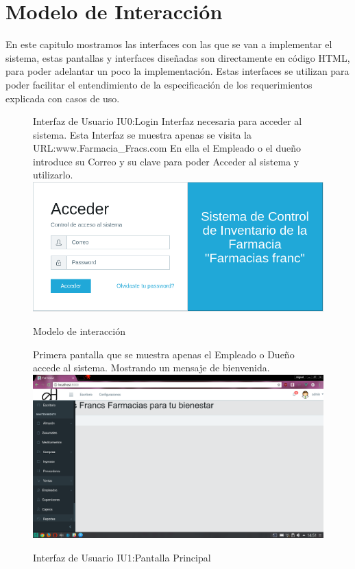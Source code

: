 \chapter{Modelo de Interacción}
 
En este capitulo mostramos las interfaces con las que se van a implementar el sistema, estas pantallas y interfaces diseñadas son directamente en código HTML, para poder adelantar un poco la implementación. 
Estas interfaces se utilizan para poder facilitar el entendimiento de la especificación de los requerimientos explicada con casos de uso.


\begin{figure}[htbp!]
	\begin{center}
	Interfaz de Usuario IU0:Login
	Interfaz necesaria para acceder al sistema.
	Esta Interfaz se muestra apenas se visita la URL:www.Farmacia\_Fracs.com
	En ella el Empleado o el dueño introduce su Correo y su clave para poder			Acceder al sistema y utilizarlo.
		\includegraphics[width=\textwidth]{Pantallas/login}
		\caption{Modelo de interacción}
	\end{center}
\end{figure}



\begin{figure}[htbp!]
	\begin{center}
	
Primera pantalla que se muestra apenas el Empleado o Dueño accede al sistema.
Mostrando un mensaje de bienvenida.
		\includegraphics[width=\textwidth]{Pantallas/PantallaPrincipal}
		\caption{Interfaz de Usuario IU1:Pantalla Principal}
	\end{center}
\end{figure}


